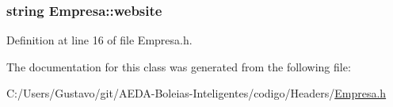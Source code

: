 \hypertarget{class_empresa_a809624b98d1db18f8627ce2fa394dddd}{
\subsubsection[{website}]{\setlength{\rightskip}{0pt plus 5cm}string Empresa\+::website\hspace{0.3cm}{\ttfamily [private]}}}\label{class_empresa_a809624b98d1db18f8627ce2fa394dddd}


Definition at line 16 of file Empresa.\+h.



The documentation for this class was generated from the following file\+:\begin{DoxyCompactItemize}
\item 
C\+:/\+Users/\+Gustavo/git/\+A\+E\+D\+A-\/\+Boleias-\/\+Inteligentes/codigo/\+Headers/\hyperlink{_empresa_8h}{Empresa.\+h}\end{DoxyCompactItemize}

